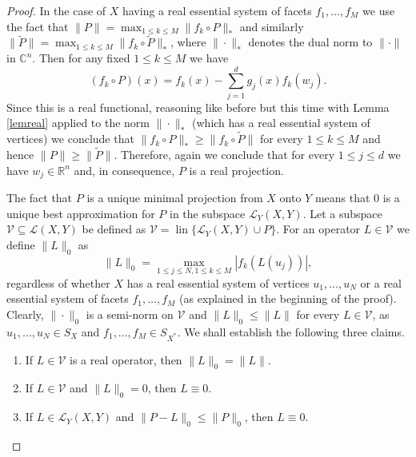 \documentclass[12pt, reqno]{amsart}
\theoremstyle{definition}
\theoremstyle{remark}
\numberwithin{equation}{section}
\DeclareMathOperator{\lin}{lin}
\begin{document}
\begin{proof}
In the case of $X$ having a real essential system of facets $f_1, \ldots, f_M$ we use the fact that $\|P\| = \max_{1 \leq k \leq M} \|f_k \circ P\|_*$ and similarly $\|\widetilde{P}\| = \max_{1 \leq k \leq M} \|f_k \circ \widetilde{P}\|_*$, where $\| \cdot \|_*$ denotes the dual norm to $\| \cdot \|$ in $\mathbb{C}^n$. Then for any fixed $1 \leq k \leq M$ we have
$$ (f_k \circ P)(x) =  f_k(x) -  \sum_{j=1}^{d} g_j(x) f_k(w_j). $$
Since this is a real functional, reasoning like before but this time with Lemma \ref{lemreal} applied to the norm $\| \cdot \|_*$ (which has a real essential system of vertices) we conclude that $\|f_k \circ P \|_* \geq \|f_k \circ \widetilde{P}\|$ for every $1 \leq k \leq M$ and hence $\|P\| \geq \|\widetilde{P}\|$. Therefore, again we conclude that for every $1 \leq j \leq d$ we have $w_j \in \mathbb{R}^n$ and, in consequence, $P$ is a real projection.

The fact that $P$ is a unique minimal projection from $X$ onto $Y$ means that $0$ is a unique best approximation for $P$ in the subspace $\mathcal{L}_Y(X, Y)$. Let a subspace $\mathcal{V} \subseteq \mathcal{L}(X, Y)$ be defined as $\mathcal{V} = \lin \{ \mathcal{L}_Y(X, Y) \cup P \}$. For an operator $L \in \mathcal{V}$ we define $\|L\|_0$ as
$$\|L\|_0 = \max_{1 \leq j \leq N, 1 \leq k \leq M} |f_k(L(u_j))|,$$
regardless of whether $X$ has a real essential system of vertices $u_1, \ldots, u_N$ or a real essential system of facets $f_1, \ldots, f_M$ (as explained in the beginning of the proof). Clearly, $\| \cdot \|_0$ is a semi-norm on $\mathcal{V}$ and $\|L\|_0 \leq \|L\|$ for every $L \in \mathcal{V}$, as $u_1, \ldots, u_N \in S_{X}$ and $f_1, \ldots, f_M \in S_{X^*}$. We shall establish the following three claims.

\begin{enumerate}
\item If $L \in \mathcal{V}$ is a real operator, then $\|L\|_0 = \|L\|.$
\item If $L \in \mathcal{V}$ and $\|L\|_0=0$, then $L \equiv 0$.
\item If $L \in \mathcal{L}_Y(X, Y)$ and $\|P-L\|_0 \leq \|P\|_0$, then $L \equiv 0$.
\end{enumerate}


\end{proof}
\end{document}
